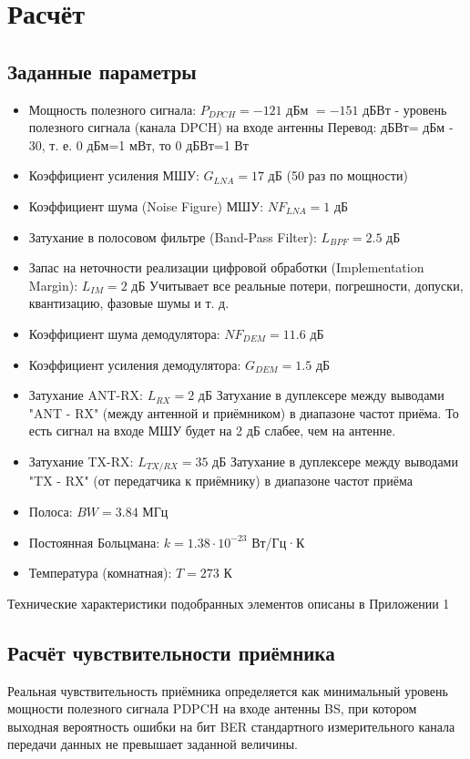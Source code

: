 \documentclass[a4paper,12pt]{article}
\begin{document}
\section{Расчёт}
\subsection{Заданные параметры}
\begin{itemize}
    \item Мощность полезного сигнала: $P_{DPCH} = -121$ дБм $= -151$ дБВт -  уровень полезного сигнала (канала DPCH) на входе антенны \newline
    Перевод: дБВт= дБм - 30,  т. е. 0 дБм=1 мВт, то 0 дБВт=1 Вт
    \item Коэффициент усиления МШУ: $G_{LNA} = 17$ дБ (50 раз по мощности)
    \item Коэффициент шума (Noise Figure) МШУ: $NF_{LNA} = 1$ дБ
    \item Затухание в полосовом фильтре (Band-Pass Filter): $L_{BPF} = 2.5$ дБ
    \item Запас на неточности реализации цифровой обработки  (Implementation Margin): $L_{IM} = 2$ дБ
    Учитывает все реальные потери, погрешности, допуски, квантизацию, фазовые шумы и т. д.
    \item Коэффициент шума демодулятора: $NF_{DEM} = 11.6$ дБ
    \item Коэффициент усиления демодулятора: $G_{DEM} = 1.5$ дБ
    \item Затухание ANT-RX: $L_{RX} = 2$ дБ  \newline
    Затухание в дуплексере между выводами "ANT - RX" (между антенной и приёмником) в диапазоне частот приёма. То есть сигнал на входе МШУ будет на 2 дБ слабее, чем на антенне.
    \item Затухание TX-RX: $L_{TX/RX} = 35$ дБ  \newline
    Затухание в дуплексере между выводами "TX - RX" (от передатчика к приёмнику)  в диапазоне частот приёма
    \item Полоса: $BW = 3.84$ МГц
    \item Постоянная Больцмана: $k = 1.38\cdot10^{-23}$ Вт/Гц·К
    \item Температура (комнатная): $T = 273$ К
\end{itemize}
Технические характеристики подобранных элементов описаны в Приложении 1

\subsection{Расчёт чувствительности приёмника}
Реальная чувствительность приёмника определяется как минимальный уровень мощности полезного сигнала PDPCH на входе антенны BS, при котором выходная вероятность ошибки на бит BER стандартного измерительного канала передачи данных не превышает заданной величины.
\end{document}
